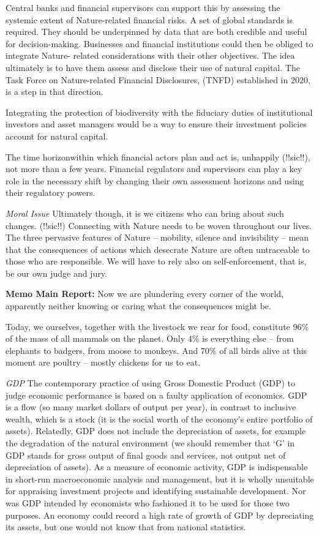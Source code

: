 \documentclass[
]{book}
\begin{document}
Central banks and financial supervisors can
support this by assessing the systemic extent of Nature-related financial risks. A set of global
standards is required. They should be underpinned by data that are both credible and useful for
decision-making. Businesses and financial institutions could then be obliged to integrate Nature-
related considerations with their other objectives. The idea ultimately is to have them assess
and disclose their use of natural capital. The Task Force on Nature-related Financial Disclosures,
(TNFD) established in 2020, is a step in that direction.

Integrating the protection of biodiversity with the fiduciary duties of
institutional investors and asset managers
would be a way to ensure their investment policies account for natural capital.

The time horizonwithin which financial actors plan and act is, unhappily (!!sic!!),
not more than a few years.
Financial regulators and supervisors can play a key role in the necessary shift
by changing their own assessment horizons and using their regulatory powers.

\emph{Moral Issue}
Ultimately though, it is we citizens who can bring about such changes. (!!sic!!)
Connecting with Nature needs to be woven throughout our lives.
The three pervasive features of Nature -- mobility, silence and invisibility --
mean that the consequences of actions
which desecrate Nature are often untraceable to those who are responsible.
We will have to rely also on self-enforcement, that is, be our own
judge and jury.

\textbf{Memo Main Report:}
Now we are plundering every corner of the world, apparently neither knowing or caring what
the consequences might be.

Today, we ourselves, together with the livestock we rear for
food, constitute 96\% of the mass of all mammals on the planet. Only 4\% is everything else --
from elephants to badgers, from moose to monkeys. And 70\% of all birds alive at this moment
are poultry -- mostly chickens for us to eat.

\emph{GDP}
The contemporary practice of using Gross Domestic Product (GDP) to judge
economic performance is based on a faulty application of economics. GDP is a flow (so many
market dollars of output per year), in contrast to inclusive wealth, which is a stock (it is the
social worth of the economy's entire portfolio of assets). Relatedly, GDP does not include the
depreciation of assets, for example the degradation of the natural environment (we should
remember that `G' in GDP stands for gross output of final goods and services, not output net
of depreciation of assets). As a measure of economic activity, GDP is indispensable in short-run
macroeconomic analysis and management, but it is wholly unsuitable for appraising investment
projects and identifying sustainable development. Nor was GDP intended by economists who
fashioned it to be used for those two purposes. An economy could record a high rate of
growth of GDP by depreciating its assets, but one would not know that from national statistics.
\end{document}
